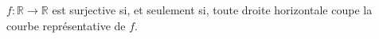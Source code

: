 $f:\mathbb{R}\to \mathbb{R}$ est surjective si, et seulement si, toute droite horizontale coupe la courbe représentative de $f$.

\begin{reponses}
\end{reponses}


